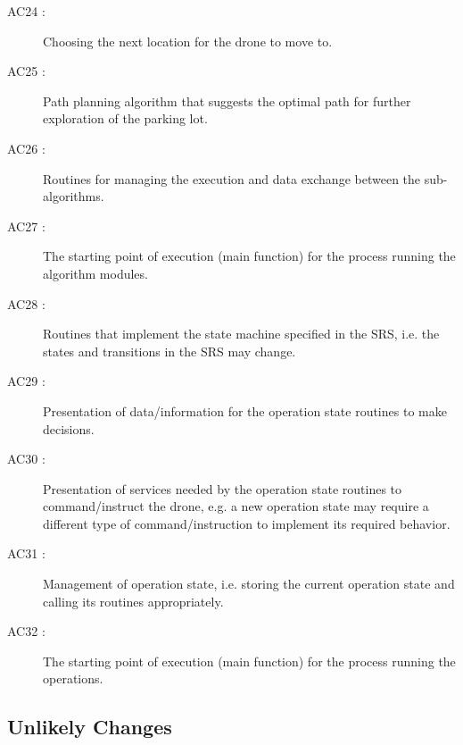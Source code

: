 \documentclass[12pt, titlepage]{article}
\begin{document}
\begin{description}
\item[AC24 \label{AC_PathPlanApp1}:] 
Choosing the next location for the drone to move to.

\item[AC25 \label{AC_PathPlanApp2}:] 
Path planning algorithm that suggests the optimal path for further exploration of the parking lot.

\item[AC26 \label{AC_AlgorithmManagerApp1}:] 
Routines for managing the execution and data exchange between the sub-algorithms.

\item[AC27 \label{AC_MainAlgorithmModule1}:]
The starting point of execution (main function) for the process running the algorithm modules. 

\item[AC28 \label{AC_OperationState1}:]
Routines that implement the state machine specified in the SRS, i.e. the states and transitions in the SRS may change. 

\item[AC29 \label{AC_OperationManager1}:]
Presentation of data/information for the operation state routines to make decisions. 

\item[AC30 \label{AC_OperationManager2}:]
Presentation of services needed by the operation state routines to command/instruct the drone, e.g. a new operation state may require a different type of command/instruction to implement its required behavior.
 
\item[AC31 \label{AC_OperationManager3}:]
Management of operation state, i.e. storing the current operation state and calling its routines appropriately.

\item[AC32 \label{AC_MainDDCModule1}:]
The starting point of execution (main function) for the process running the operations. 

\end{description}


\subsection{Unlikely Changes} \label{SecUchange}
\end{document}
